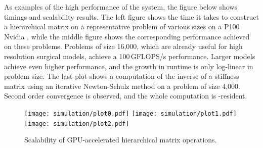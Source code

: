 %


%

As examples of the high performance of the system, the figure below shows  timings and scalability results. The left figure shows the time it takes to construct a hierarchical matrix on a representative problem of various sizes on a P100 Nvidia , while the middle figure shows the corresponding performance achieved on these problems. Problems of size 16,000, which are already useful for high resolution surgical models, achieve a 100\,GFLOPS/s performance. Larger models achieve even higher performance, and the growth in runtime is only log-linear in problem size. The last plot shows a computation of the inverse of a stiffness matrix using an iterative Newton-Schulz method on a problem of size 4,000. Second order convergence is observed, and the whole computation is -resident.

\begin{figure}
  \centering%
  \texttt{[image: simulation/plot0.pdf]}
  \hfill%
  \texttt{[image: simulation/plot1.pdf]}
  \hfill%
  \texttt{[image: simulation/plot2.pdf]}
  \vspace{-15ex}
  \caption{Scalability of GPU-accelerated hierarchical matrix operations.}\label{fig:plots}
\end{figure}

